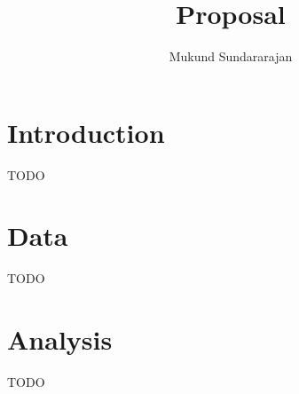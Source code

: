 \documentclass[stu]{apa7}
\title{Proposal}
\author{Mukund Sundararajan}
\affiliation{University of British Columbia}
\begin{document}
    \maketitle
    \section{Introduction}
    TODO
    \section{Data}
    TODO
    \section{Analysis}
    TODO
    
\end{document}

